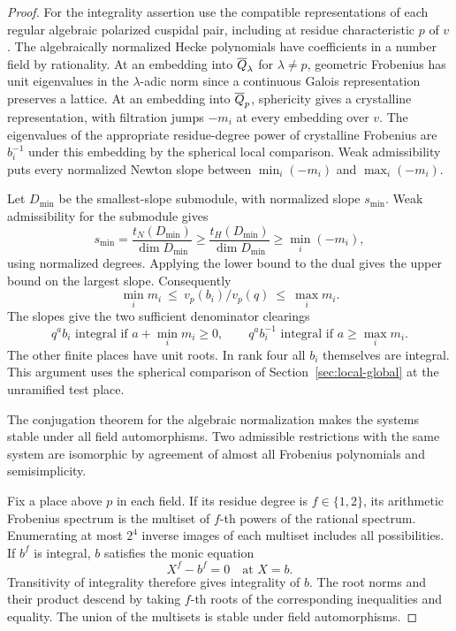 \begin{proof}
For the integrality assertion use the compatible representations
of each regular algebraic polarized cuspidal pair, including
at residue characteristic \(p\) of \(v\). The algebraically
normalized Hecke polynomials have coefficients in a number
field by rationality. At an embedding into
\(\overline{Q}_{\lambda}\) for \(\lambda\ne p\), geometric
Frobenius has unit eigenvalues in the \(\lambda\)-adic norm
since a continuous Galois representation preserves a lattice.
At an embedding into \(\overline{Q}_p\), sphericity gives a
crystalline representation, with filtration jumps \(-m_i\)
at every embedding over \(v\). The eigenvalues of the appropriate
residue-degree power of crystalline Frobenius are \(b_i^{-1}\)
under this embedding by the spherical local comparison.
Weak admissibility puts every normalized Newton slope between
\(\min_i(-m_i)\) and \(\max_i(-m_i)\).

Let \(D_{\min}\) be the smallest-slope submodule, with normalized slope \(s_{\min}\). Weak admissibility for the submodule gives
\[
 s_{\min}=\frac{t_N(D_{\min})}{\dim D_{\min}}
 \ge \frac{t_H(D_{\min})}{\dim D_{\min}}
 \ge \min_i(-m_i),
\]
using normalized degrees. Applying the lower bound to the dual gives the upper bound on the largest slope. Consequently
\[
      \min_i m_i\ \le\ v_p(b_i)/v_p(q)\ \le\ \max_i m_i .
\]
The slopes give the two sufficient denominator clearings
\[
     q^a b_i \text{ integral if }a+\min_i m_i\ge0,\qquad
     q^a b_i^{-1}\text{ integral if }a\ge\max_i m_i.
\]
The other finite places have unit roots.
In rank four all \(b_i\) themselves are integral. This
argument uses the spherical comparison of
Section~\ref{sec:local-global} at the unramified test place.
\hfill\mbox{\cite{tadic,clozel-motifs,blggt,blggt-lg}}\label{cor:ordinary-symplectic-cohomology-20}

The conjugation theorem for the algebraic normalization makes the
systems stable under all field automorphisms. Two admissible
restrictions with the same system are isomorphic by agreement of
almost all Frobenius polynomials and semisimplicity.

Fix a place above \(p\) in each field. If its residue
degree is \(f\in\{1,2\}\), its arithmetic Frobenius spectrum
is the multiset of \(f\)-th powers of the rational
spectrum. Enumerating at most \(2^4\) inverse images
of each multiset includes all possibilities.
If \(b^f\) is integral, \(b\) satisfies the monic equation
\[
 X^f-b^f=0\quad\text{at }X=b .
\]
Transitivity of integrality therefore gives integrality of \(b\). The root norms and their product descend
by taking \(f\)-th roots of the corresponding inequalities
and equality. The union of the multisets is stable under
field automorphisms.


\end{proof}

